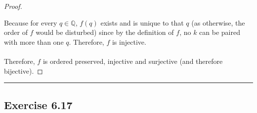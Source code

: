 \documentclass[openany, amssymb, psamsfonts]{amsart}
\newcommand{\bbQ}{\mathbb{Q}}
\theoremstyle{definition}
\numberwithin{equation}{section}
\begin{document}
\begin{proof}
\begin{enumerate}
\begin{enumerate}
    \end{enumerate}
\end{enumerate}
Because for every $q\in \bbQ$, $f(q)$ exists and is unique to that $q$ (as otherwise, the order of $f$ would be disturbed) since by the definition of $f$, no $k$ can be paired with more than one $q$. Therefore, $f$ is injective.\\\\
Therefore, $f$ is ordered preserved, injective and surjective (and therefore bijective).
\end{proof}\vspace{4pt}     \hrule   \vspace{4pt}

\subsection*{Exercise 6.17}
\end{document}
